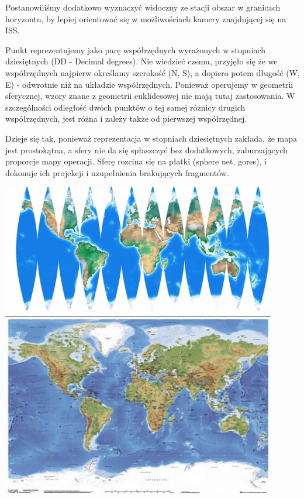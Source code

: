 Postanowiliśmy dodatkowo wyznaczyć widoczny ze stacji obszar w granicach horyzontu, by lepiej
orientować się w możliwościach kamery znajdującej się na ISS.

Punkt reprezentujemy jako parę współrzędnych wyrażonych w stopniach dziesiętnych (DD - Decimal degrees).
Nie wiedzieć czemu, przyjęło się że we współrzędnych najpierw określamy szerokość (N, S),
a dopiero potem długość (W, E) - odwrotnie niż na układzie współrzędnych.
Ponieważ operujemy w geometrii sferycznej, wzory znane z geometrii euklidesowej nie mają
tutaj zastosowania. W szczególności odległość dwóch punktów o tej samej różnicy drugich współrzędnych,
jest różna i zależy także od pierwszej współrzędnej.

Dzieje się tak, ponieważ reprezentacja w stopniach dziesiętnych zakłada, że mapa jest prostokątna, a
sfery nie da się spłaszczyć bez dodatkowych, zaburzających proporcje mapy operacji. Sferę rozcina
się na płatki (sphere net, gores), i dokonuje ich projekcji i uzupełnienia brakujących fragmentów.

\begin{center}
    \includegraphics[width=0.9\textwidth]{photos/gores_map.jpg}
    \includegraphics[width=0.9\textwidth]{photos/full_map.jpg}
\end{center}

